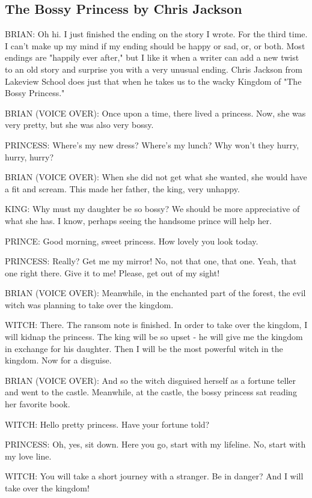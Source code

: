 \subsection{The Bossy Princess by Chris Jackson}

BRIAN:
Oh hi.
I just finished the ending on the story I wrote.
For the third time.
I can't make up my mind if my ending should be happy or sad, or, or both.
Most endings are "happily ever after," but I like it when a writer can add a new twist to an old story and surprise you with a very unusual ending.
Chris Jackson from Lakeview School does just that when he takes us to the wacky Kingdom of "The Bossy Princess."

BRIAN (VOICE OVER):
Once upon a time, there lived a princess.
Now, she was very pretty, but she was also very bossy.

PRINCESS:
Where's my new dress?
Where's my lunch?
Why won't they hurry, hurry, hurry?

BRIAN (VOICE OVER):
When she did not get what she wanted, she would have a fit and scream.
This made her father, the king, very unhappy.

KING:
Why must my daughter be so bossy?
We should be more appreciative of what she has.
I know, perhaps seeing the handsome prince will help her.

PRINCE:
Good morning, sweet princess.
How lovely you look today.

PRINCESS:
Really?
Get me my mirror!
No, not that one, that one.
Yeah, that one right there. Give it to me!
Please, get out of my sight!

BRIAN (VOICE OVER):
Meanwhile, in the enchanted part of the forest, the evil witch was planning to take over the kingdom.

WITCH:
There.
The ransom note is finished.
In order to take over the kingdom, I will kidnap the princess.
The king will be so upset - he will give me the kingdom in exchange for his daughter.
Then I will be the most powerful witch in the kingdom.
Now for a disguise.

BRIAN (VOICE OVER):
And so the witch disguised herself as a fortune teller and went to the castle.
Meanwhile, at the castle, the bossy princess sat reading her favorite book.

WITCH:
Hello pretty princess.
Have your fortune told?

PRINCESS:
Oh, yes, sit down.
Here you go, start with my lifeline.
No, start with my love line.

WITCH:
You will take a short journey with a stranger.
Be in danger?
And I will take over the kingdom!

